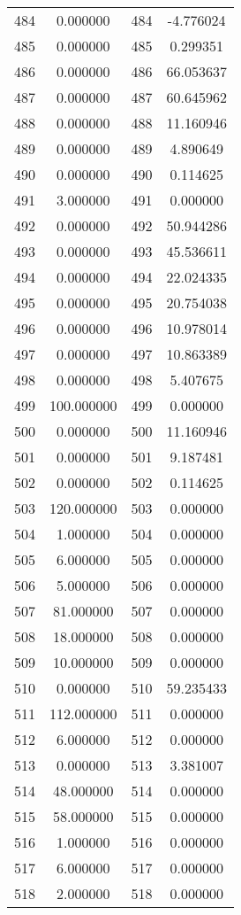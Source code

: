 \documentclass[12pt]{article}
\begin{document}
\begin{longtable}{@{}cccc@{}}
484 & 0.000000 & 484 & -4.776024 \\
485 & 0.000000 & 485 & 0.299351 \\
486 & 0.000000 & 486 & 66.053637 \\
487 & 0.000000 & 487 & 60.645962 \\
488 & 0.000000 & 488 & 11.160946 \\
489 & 0.000000 & 489 & 4.890649 \\
490 & 0.000000 & 490 & 0.114625 \\
491 & 3.000000 & 491 & 0.000000 \\
492 & 0.000000 & 492 & 50.944286 \\
493 & 0.000000 & 493 & 45.536611 \\
494 & 0.000000 & 494 & 22.024335 \\
495 & 0.000000 & 495 & 20.754038 \\
496 & 0.000000 & 496 & 10.978014 \\
497 & 0.000000 & 497 & 10.863389 \\
498 & 0.000000 & 498 & 5.407675 \\
499 & 100.000000 & 499 & 0.000000 \\
500 & 0.000000 & 500 & 11.160946 \\
501 & 0.000000 & 501 & 9.187481 \\
502 & 0.000000 & 502 & 0.114625 \\
503 & 120.000000 & 503 & 0.000000 \\
504 & 1.000000 & 504 & 0.000000 \\
505 & 6.000000 & 505 & 0.000000 \\
506 & 5.000000 & 506 & 0.000000 \\
507 & 81.000000 & 507 & 0.000000 \\
508 & 18.000000 & 508 & 0.000000 \\
509 & 10.000000 & 509 & 0.000000 \\
510 & 0.000000 & 510 & 59.235433 \\
511 & 112.000000 & 511 & 0.000000 \\
512 & 6.000000 & 512 & 0.000000 \\
513 & 0.000000 & 513 & 3.381007 \\
514 & 48.000000 & 514 & 0.000000 \\
515 & 58.000000 & 515 & 0.000000 \\
516 & 1.000000 & 516 & 0.000000 \\
517 & 6.000000 & 517 & 0.000000 \\
518 & 2.000000 & 518 & 0.000000 \\

\end{longtable}
\end{document}
